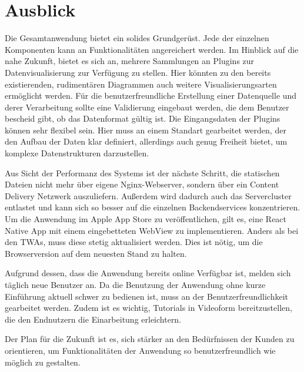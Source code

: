 \chapter{Ausblick}
\label{chap:ausblick}

Die Gesamtanwendung bietet ein solides Grundgerüst. Jede der einzelnen Komponenten
kann an Funktionalitäten angereichert werden. Im Hinblick auf die nahe Zukunft, bietet es sich an,
mehrere Sammlungen an Plugins zur Datenvisualisierung zur Verfügung zu stellen. Hier könnten
zu den bereits existierenden, rudimentären Diagrammen auch weitere Visualisierungsarten ermöglicht
werden. Für die benutzerfreundliche Erstellung einer Datenquelle und derer Verarbeitung
sollte eine Validierung eingebaut werden, die dem Benutzer bescheid gibt, ob das Datenformat
gültig ist. Die Eingangsdaten der Plugins können sehr flexibel sein. Hier muss an einem Standart
gearbeitet werden, der den Aufbau der Daten klar definiert, allerdings auch genug Freiheit bietet,
um komplexe Datenstrukturen darzustellen.

Aus Sicht der Performanz des Systems ist der nächste
Schritt, die statischen Dateien nicht mehr über eigene Nginx-Webserver, sondern über ein
Content Delivery Netzwerk auszuliefern. Außerdem wird dadurch auch das Servercluster
entlastet und kann sich so besser auf die einzelnen Backendservices konzentrieren.
Um die Anwendung im Apple App Store zu veröffentlichen, gilt es, eine React Native
App mit einem eingebetteten WebView zu implementieren. Anders als bei den TWAs, muss
diese stetig aktualisiert werden. Dies ist nötig, um die Browserversion auf
dem neuesten Stand zu halten. 

Aufgrund dessen, dass die Anwendung bereits online Verfügbar ist,
melden sich täglich neue Benutzer an. Da die Benutzung der Anwendung ohne kurze Einführung
aktuell schwer zu bedienen ist, muss an der Benutzerfreundlichkeit gearbeitet werden. Zudem
ist es wichtig, Tutorials in Videoform bereitzustellen, die den Endnutzern die Einarbeitung
erleichtern.

Der Plan für die Zukunft ist es, sich stärker an den Bedürfnissen der Kunden zu orientieren,
um Funktionalitäten der Anwendung so benutzerfreundlich wie möglich zu gestalten.

